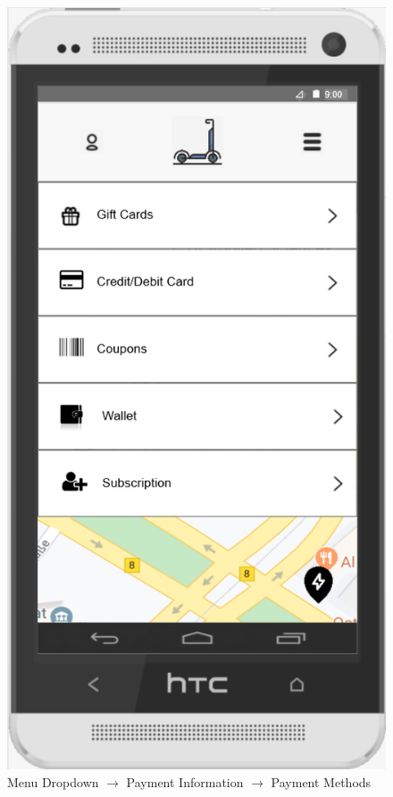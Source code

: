 \documentclass[a4paper, 12pt]{article}
\begin{document}
\begin{figure} [htbp]
  \begin{center}
    \includegraphics[scale=0.75]{images/prototypes/02-02-01-menu-dropdown--payment-information--payment-methods.png}
  \end{center}
  \caption{Menu Dropdown $\rightarrow$ Payment Information $\rightarrow$ Payment Methods}
\end{figure}
\end{document}
